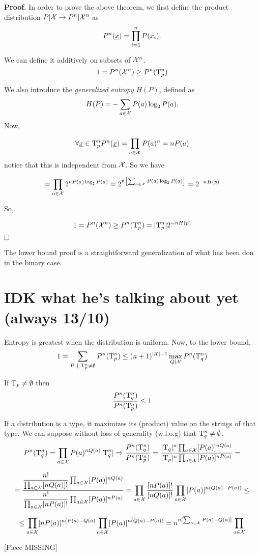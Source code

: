 \noindent\textbf{Proof.} In order to prove the above theorem, we first define the product distribution $P|\mathcal{X} \rightarrow P^n|\mathcal{X}^n$ as 
\begin{equation}
	P^n(\underline{x}) = \prod_{i = 1}^nP(x_i).
\end{equation}

We can define it additively on subsets of $\mathcal{X}^n$.
\[
1 = P^n(\mathcal{X}^n) \geq P^n(\mathrm{T}_p^n)
\]

We also introduce the \emph{generalized entropy} $H(P)$, defined as $$H(P) = -\sum_{a \in \mathcal{X}} P(a)\log_2P(a).$$
Now,

\[
\forall \underline{x} \in \mathrm{T}_p^n P^n(\underline{x}) = \prod_{a \in \mathcal{X}}P(a)^n = nP(a)
\]
notice that this is independent from $\mathcal{X}$. So we have

\[ 
= \prod_{a \in \mathcal{X}} 2^{nP(a)\log_2P(a)} = 2^{n\left[\sum_{a \in \mathcal{X}} P(a)\log_2P(a)\right]} = 2^{-nH(p)}
\]

So,

\[1 = P^n(\mathcal{X}^n) \geq P^n(\mathrm{T}^n_p) = |\mathrm{T}_p^n|2^{-nH(p)} \] $\hfill\Box$

The lower bound proof is a straightforward generalization of what has been don in the binary case.

\section{IDK what he's talking about yet (always 13/10)}
Entropy is greatest when the distribution is uniform. Now, to the lower bound.
\[
1 = \sum_{P\ |\ \mathrm{T}_p^n \not= \emptyset}P^n(\mathrm{T}_p^n) \leq (n+1)^{|\mathcal{X}|-1} \max_{Q|\mathcal{X}}P^n(\mathrm{T}_q^n)
\]

\begin{obs}
If $\mathrm{T}_p \not= \emptyset$ then $$\dfrac{P^n(\mathrm{T}^n_q)}{P^n(\mathrm{T}^n_p)} \leq 1$$
\end{obs}

If a distribution is a type, it maximizes its (product) value on the strings of that type. We can suppose without loss of generality (w.l.o.g) that $\mathrm{T}^n_q \not= \emptyset$.
\[
P^n(\mathrm{T}_q^n) = \prod_{a \in \mathcal{X}} P(a)^{nQ(a)}|\mathrm{T}_q^n| \Rightarrow \dfrac{P^n(\mathrm{T}_q^n)}{P^n(\mathrm{T}_p^n)} = \dfrac{|\mathrm{T}_q|^n\prod_{a \in \mathcal{X}}[P(a)]^{nQ(a)}}{|\mathrm{T}_p|^n\prod_{a \in \mathcal{X}}[P(a)]^{nP(a)}} =
\]

\[
 = \dfrac{\dfrac{n!}{\prod_{a\in\mathcal{X}}[nQ(a)]!}\prod_{a\in\mathcal{X}}[P(a)]^{nQ(a)}}
 {\dfrac{n!}{\prod_{a\in\mathcal{X}}[nP(a)]!}\prod_{a\in\mathcal{X}}[P(a)]^{nP(a)}} = \prod_{a \in\mathcal{X}} \dfrac{[nP(a)]!}{[nQ(a)]!}\prod_{a\in\mathcal{X}}[P(a)]^{n(Q(a)-P(a))}\leq 
\]

\[
\leq \prod_{a \in \mathcal{X}} [nP(a)]^{n(P(a)-Q(a)}\prod_{a\in\mathcal{X}}[P(a)]^{n(Q(a)-P(a))} = n^{n[\sum_{a \in \mathcal{X}}P(a) - Q(a)]}\prod_{a\in\mathcal{X}}
\]

[Piece MISSING]
